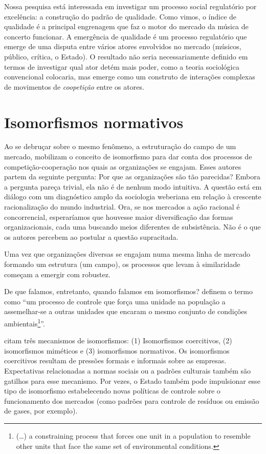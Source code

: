 \documentclass[a4paper, 12pt, openright, oneside, german, french, english, brazil]{abntex2}
\begin{document}
	Nossa pesquisa está interessada em investigar um processo social regulatório por excelência: a construção do padrão de qualidade. Como vimos, o índice de qualidade é a principal engrenagem que faz o motor do mercado da música de concerto funcionar. A emergência de qualidade é um processo regulatório que emerge de uma disputa entre vários atores envolvidos no mercado (músicos, público, crítica, o Estado). O resultado não seria necessariamente definido em termos de investigar qual ator detém mais poder, como a teoria sociológica convencional colocaria, mas emerge como um construto de interações complexas de movimentos de \textit{coopetição} entre os atores.
	
	\section{Isomorfismos normativos}

	Ao se debruçar sobre o mesmo fenômeno, a estruturação do campo de um mercado,  mobilizam o conceito de isomorfismo para dar conta dos processos de competição-cooperação nos quais as organizações se engajam. Esses autores partem da seguinte pergunta: Por que as organizações são tão parecidas? Embora a pergunta pareça trivial, ela não é de nenhum modo intuitiva. A questão está em diálogo com um diagnóstico amplo da sociologia weberiana em relação à crescente racionalização do mundo industrial. Ora, se nos mercados a ação racional é concorrencial, esperaríamos que houvesse maior diversificação das formas organizacionais, cada uma buscando meios diferentes de subsistência. Não é o que os autores percebem ao postular a questão supracitada. %

	Uma vez que organizações diversas se engajam numa mesma linha de mercado formando um estrutura (um campo), os processos que levam à similaridade começam a emergir com robustez.

	De que falamos, entretanto, quando falamos em isomorfismos?  definem o termo como ``um processo de controle que força uma unidade na população a assemelhar-se a outras unidades que encaram o mesmo conjunto de condições ambientais\footnote{(\dots) a constraining process that forces one unit in a population to resemble other units that face the same set of environmental conditions.}''.

	 citam três mecanismos de isomorfismos: (1) Isomorfismos coercitivos, (2) isomorfismos miméticos e (3) isomorfismos normativos. Os isomorfismos coercitivos resultam de pressões formais e informais sobre as empresas. Expectativas relacionadas a normas sociais ou a padrões culturais também são gatilhos para esse mecanismo. Por vezes, o Estado também pode impulsionar esse tipo de isomorfismo estabelecendo novas políticas de controle sobre o funcionamento dos mercados (como padrões para controle de resíduos ou emissão de gases, por exemplo).
\end{document}
